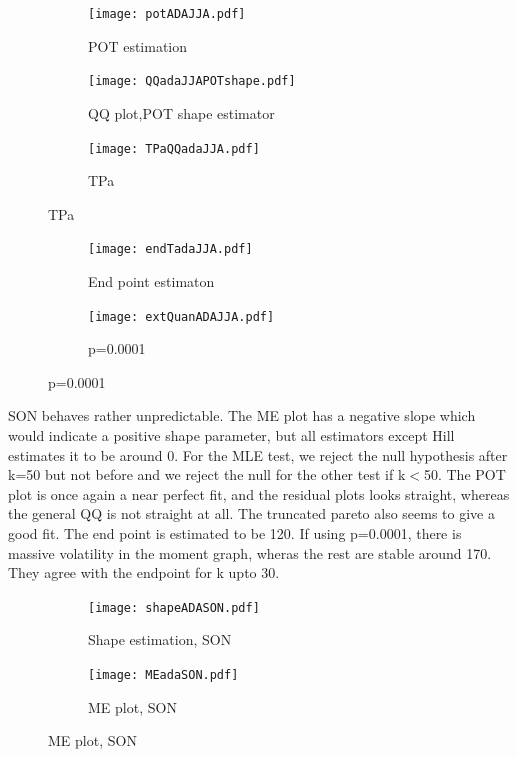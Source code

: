 \documentclass{article}
\begin{document}
	\begin{figure}[H]
		\centering
		\begin{subfigure}{0.3\textwidth}
			\texttt{[image: potADAJJA.pdf]}
			\caption{POT estimation}
		\end{subfigure}%
		\begin{subfigure}{0.3\textwidth}
			\texttt{[image: QQadaJJAPOTshape.pdf]}
			\caption{QQ plot,POT shape estimator}
		\end{subfigure}%
		\begin{subfigure}{0.3\textwidth}
			\texttt{[image: TPaQQadaJJA.pdf]}
			\caption{TPa }
		\end{subfigure}%
	\end{figure}

	\begin{figure}[H]
		\centering
		\begin{subfigure}{0.5\textwidth}
			\texttt{[image: endTadaJJA.pdf]}
			\caption{End point estimaton}
		\end{subfigure}%
		\begin{subfigure}{0.5\textwidth}
			\texttt{[image: extQuanADAJJA.pdf]}
			\caption{p=0.0001}
		\end{subfigure}
	\end{figure}
	
	SON behaves rather unpredictable. The ME plot has a negative slope which would indicate a positive shape parameter, but all estimators except Hill estimates it to be around 0. For the MLE test, we reject the null hypothesis after k=50 but not before and we reject the null for the other test if k$<$50. The POT plot is once again a near perfect fit, and the residual plots looks straight, whereas the general QQ is not straight at all. The truncated pareto also seems to give a good fit. The end point is estimated to be 120. If using p=0.0001, there is massive volatility in the moment graph, wheras the rest are stable around 170. They agree with the endpoint for k upto 30. 
	
	\begin{figure}[H]
		\begin{subfigure}{0.5\textwidth}
			\texttt{[image: shapeADASON.pdf]}
			\caption{Shape estimation, SON}
		\end{subfigure}%
		\begin{subfigure}{0.5\textwidth}
			\texttt{[image: MEadaSON.pdf]}
			\caption{ME plot, SON}
		\end{subfigure}
	\end{figure}
\end{document}
